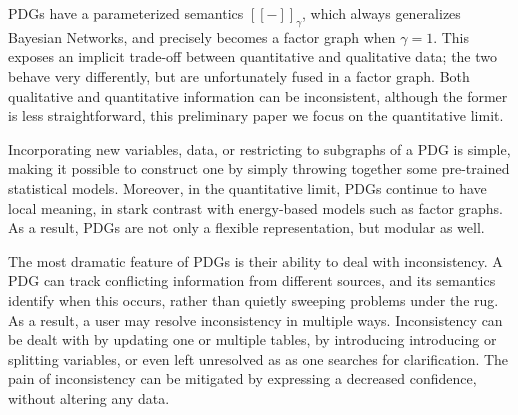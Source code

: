 \documentclass{article}
\theoremstyle{plain}
\theoremstyle{definition}
\newenvironment{example}
	{\pushQED{\qed}\renewcommand{\qedsymbol}{$\triangle$}\examplex}
	{\popQED\endexamplex%
}
\theoremstyle{remark}
\newcommand{\todo}[1]{{\color{red}\ \!\Large\smash{\textbf{[}}{\normalsize\textsc{todo:} #1}\ \!\smash{\textbf{]}}}}
\numberwithin{equation}{section}
\begin{document}
	PDGs have a parameterized semantics $[[ - ]]_\gamma$, which always generalizes Bayesian Networks, and precisely becomes a factor graph when $\gamma=1$.  This exposes an implicit trade-off between quantitative and qualitative data; the two behave very differently, but are unfortunately fused in a factor graph. Both qualitative and quantitative information can be inconsistent, although the former is less straightforward, this preliminary paper we focus on the quantitative limit.

	Incorporating new variables, data, or restricting to subgraphs of a PDG is simple, making it possible to construct one by simply throwing together some pre-trained statistical models. Moreover, in the quantitative limit, PDGs continue to have local meaning, in stark contrast with energy-based models such as factor graphs. As a result, PDGs are not only a flexible representation, but modular as well.

	The most dramatic feature of PDGs is their ability to deal with inconsistency. A PDG can track conflicting information from different sources, and its semantics identify when this occurs, rather than quietly sweeping problems under the rug.
	As a result, a user may resolve inconsistency in multiple ways. Inconsistency can be dealt with by updating one or multiple tables, by introducing introducing or splitting variables, or even left unresolved as as one searches for clarification. The pain of inconsistency can be mitigated by expressing a decreased confidence, without altering any data. 



	
\end{document}
